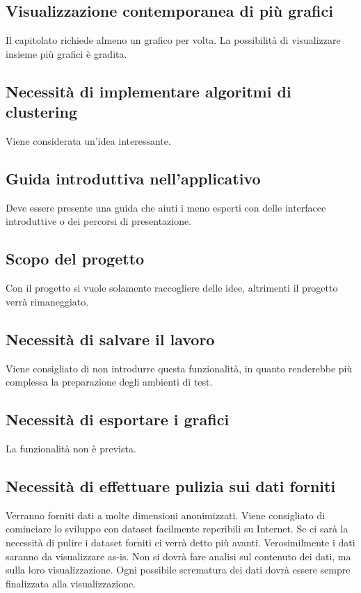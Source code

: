 \documentclass{article}
\begin{document}
    \subsection{Visualizzazione contemporanea di più grafici}
    \label{sub:domanda_04}
    Il capitolato richiede almeno un grafico per volta. La possibilità di visualizzare insieme più grafici è gradita.

    \subsection{Necessità di implementare algoritmi di clustering}
    \label{sub:domanda_05}
    Viene considerata un'idea interessante.

    \subsection{Guida introduttiva nell'applicativo}
    \label{sub:domanda_06}
    Deve essere presente una guida che aiuti i meno esperti con delle interfacce introduttive o dei percorsi di presentazione.

    \subsection{Scopo del progetto}
    \label{sub:domanda_07}
    Con il progetto si vuole solamente raccogliere delle idee, altrimenti il progetto verrà rimaneggiato.

    \subsection{Necessità di salvare il lavoro}
    \label{sub:domanda_08}
    Viene consigliato di non introdurre questa funzionalità, in quanto renderebbe più complessa la preparazione degli ambienti di test.

    \subsection{Necessità di esportare i grafici}
    \label{sub:domanda_09}
    La funzionalità non è prevista.

    \subsection{Necessità di effettuare pulizia sui dati forniti}
    \label{sub:domanda_10}
    Verranno forniti dati a molte dimensioni anonimizzati. Viene consigliato di cominciare lo sviluppo con dataset facilmente reperibili su Internet. Se ci sarà la necessità di pulire i dataset forniti ci verrà detto più avanti. Verosimilmente i dati saranno da visualizzare as-is. Non si dovrà fare analisi sul contenuto dei dati, ma sulla loro visualizzazione. Ogni possibile scrematura dei dati dovrà essere sempre finalizzata alla visualizzazione.
\end{document}
